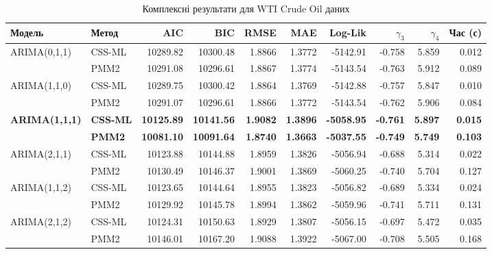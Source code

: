 \documentclass[12pt,a4paper]{article}
\begin{document}
\begin{table}[htbp]
\centering
\begingroup
\setlength{\tabcolsep}{5pt}
\scriptsize
\caption{Комплексні результати для WTI Crude Oil даних}
\label{tab:wti_comprehensive_results}
\begin{tabular}{@{}llrrrrrrrr@{}}
\toprule
\textbf{Модель} & \textbf{Метод} & \textbf{AIC} & \textbf{BIC} & \textbf{RMSE} & \textbf{MAE} & \textbf{Log-Lik} & $\gamma_3$ & $\gamma_4$ & \textbf{Час (с)} \\
\midrule
ARIMA(0,1,1) & CSS-ML & 10289.82 & 10300.48 & 1.8866 & 1.3772 & -5142.91 & -0.758 & 5.859 & 0.012 \\
             & PMM2   & 10291.08 & 10296.61 & 1.8867 & 1.3774 & -5143.54 & -0.763 & 5.912 & 0.089 \\
\midrule
ARIMA(1,1,0) & CSS-ML & 10289.75 & 10300.42 & 1.8864 & 1.3769 & -5142.88 & -0.757 & 5.847 & 0.010 \\
             & PMM2   & 10291.07 & 10296.61 & 1.8866 & 1.3772 & -5143.54 & -0.762 & 5.906 & 0.084 \\
\midrule
\rowcolor{yellow!20}
\textbf{ARIMA(1,1,1)} & \textbf{CSS-ML} & \textbf{10125.89} & \textbf{10141.56} & \textbf{1.9082} & \textbf{1.3896} & \textbf{-5058.95} & \textbf{-0.761} & \textbf{5.897} & \textbf{0.015} \\
\rowcolor{green!20}
             & \textbf{PMM2}   & \textbf{10081.10} & \textbf{10091.64} & \textbf{1.8740} & \textbf{1.3663} & \textbf{-5037.55} & \textbf{-0.749} & \textbf{5.749} & \textbf{0.103} \\
\midrule
ARIMA(2,1,1) & CSS-ML & 10123.88 & 10144.88 & 1.8959 & 1.3826 & -5056.94 & -0.688 & 5.314 & 0.022 \\
             & PMM2   & 10130.49 & 10146.37 & 1.9001 & 1.3869 & -5060.25 & -0.740 & 5.704 & 0.127 \\
\midrule
ARIMA(1,1,2) & CSS-ML & 10123.65 & 10144.64 & 1.8955 & 1.3823 & -5056.82 & -0.689 & 5.334 & 0.024 \\
             & PMM2   & 10129.92 & 10145.78 & 1.8994 & 1.3862 & -5059.96 & -0.741 & 5.711 & 0.131 \\
\midrule
ARIMA(2,1,2) & CSS-ML & 10124.31 & 10150.63 & 1.8929 & 1.3807 & -5056.15 & -0.697 & 5.472 & 0.035 \\
             & PMM2   & 10146.01 & 10167.20 & 1.9088 & 1.3922 & -5067.00 & -0.708 & 5.505 & 0.168 \\
\bottomrule
\end{tabular}
\endgroup
\end{table}
\end{document}
